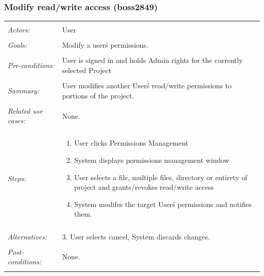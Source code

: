 \documentclass[11pt]{report}
\begin{document}
\subsubsection{Modify read/write access (boss2849)}
\begin{tabular}{ p{2cm} p{12cm} }
 \hline
 \\
 \textit{Actors:} & User \\ 
 \\
 \textit{Goals:} & Modify a user\'s permissions. \\
 \\
 \textit{Pre-conditions:} & User is signed in and holds Admin rights for the currently selected Project\\
 \\
 \textit{Summary:} & User modifies another User\'s read/write permissions to portions of the project. \\
 \\
 \textit{Related use cases:} & None. \\ 
 \\
 \textit{Steps:} & \begin{enumerate}
  \item User clicks Permissions Management
  \item System displays permissions management window
  \item User selects a file, multiple files, directory or entirety of project and grants/revokes read/write access
  \item System modifes the target User\'s permissions and notifies them.
 \end{enumerate} \\
 \\
 \textit{Alternatives:} & 3. User selects cancel, System discards changes. \\
 \\
 \textit{Post-conditions:} & None. \\
 \\
\hline
\end{tabular}
\end{document}
